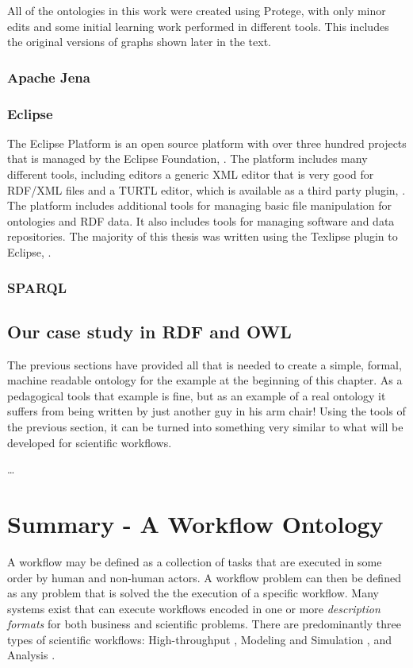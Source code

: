 All of the ontologies in this work were created using Protege, with only minor
edits and some initial learning work performed in different tools. This includes
the original versions of graphs shown later in the text.

\subsubsection{Apache Jena}
\subsubsection{Eclipse}

The Eclipse Platform is an open source platform with over three hundred projects
that is managed by the Eclipse Foundation, \cite{eclipse}. The platform includes
many different tools, including editors a generic XML editor that is very good
for RDF/XML files and a TURTL editor, which is available as a third party
plugin, \cite{}. The platform includes additional tools for managing basic file
manipulation for ontologies and RDF data. It also includes tools for managing
software and data repositories. The majority of this thesis was written using
the Texlipse plugin to Eclipse, \cite{texlipse}.

\subsubsection{SPARQL}

\subsection{Our case study in RDF and OWL}

The previous sections have provided all that is needed to create a simple,
formal, machine readable ontology for the example at the beginning of this
chapter. As a pedagogical tools that example is fine, but as an example of a
real ontology it suffers from being written by just another guy in his arm
chair! Using the tools of the previous section, it can be turned into something
very similar to what will be developed for scientific workflows.

\ldots

\section{Summary - A Workflow Ontology}

A workflow may be defined as a collection of tasks that are executed in some
order by human and non-human actors. A workflow problem can then be defined as
any problem that is solved the the execution of a specific workflow. Many
systems exist that can execute workflows encoded in one or more
\textit{description formats} for both business and scientific problems. There
are predominantly three types of scientific workflows: High-throughput \cite{},
Modeling and Simulation \cite{}, and Analysis \cite{}.


